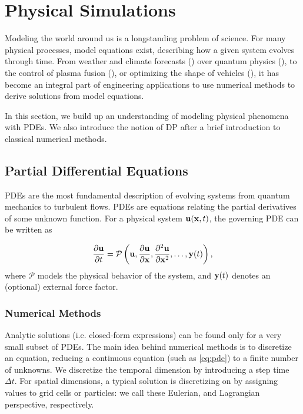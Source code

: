\chapter{Physical Simulations}\label{chapter:physical-simulations}
Modeling the world around us is a longstanding problem of science. For many
physical processes, model equations exist, describing how a given system evolves
through time. From weather and climate forecasts (\cite{stocker2014climate})
over quantum physics (\cite{QuantumSim}), to the control of plasma fusion
(\cite{PlasmaControl}), or optimizing the shape of
vehicles (\cite{OptimizationCFD}), it has become an integral part of engineering
applications to use numerical methods to derive solutions from model equations.

In this section, we build up an understanding of modeling physical phenomena
with \acfp{PDE}. We also introduce the notion of \acf{DP} after a brief
introduction to classical numerical methods.

\section{Partial Differential Equations}
\acp{PDE} are the most fundamental description of evolving systems from quantum
mechanics to turbulent flows. \acp{PDE} are equations relating the partial
derivatives of some unknown function. For a physical system $\vb{u}(\vb{x},t)$,
the governing \ac{PDE} can be written as

\begin{equation}
\label{eq:pde}
\pdv{\vb{u}}{t} = \mathcal{P}\left(\vb{u}, \pdv{\vb{u}}{\vb{x}},
\pdv[2]{\vb{u}}{\vb{x}},\dots,\vb{y}(t)\right),
\end{equation}
where $\mathcal{P}$ models the physical behavior of the system, and $\vb{y}(t)$
denotes an (optional) external force factor. 

\subsection{Numerical Methods}
Analytic solutions (i.e. closed-form expressions) can be found only for a very
small subset of \acfp{PDE}. The main idea behind numerical methods is to
discretize an equation, reducing a continuous equation (such as \ref{eq:pde}) to
a finite number of unknowns. We discretize the temporal dimension by introducing
a step time $\Delta t$. For spatial dimensions, a typical solution is discretizing
on by assigning values to grid cells or particles: we call these Eulerian, and
Lagrangian perspective, respectively.

